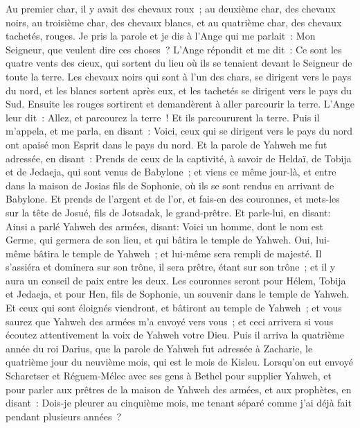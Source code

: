 \begin{multicols}{2}
Au premier char, il y avait des chevaux roux~; au deuxième char, des chevaux noirs,
au troisième char, des chevaux blancs, et au quatrième char, des chevaux tachetés, rouges.
Je pris la parole et je dis à l'Ange qui me parlait~: Mon Seigneur, que veulent dire ces choses~?
L'Ange répondit et me dit~: Ce sont les quatre vents des cieux, qui sortent du lieu où ils se tenaient devant le Seigneur de toute la terre.
Les chevaux noirs qui sont à l'un des chars, se dirigent vers le pays du nord, et les blancs sortent après eux, et les tachetés se dirigent vers le pays du Sud.
Ensuite les rouges sortirent et demandèrent à aller parcourir la terre. L'Ange leur dit~: Allez, et parcourez la terre~! Et ils parcoururent la terre.
Puis il m'appela, et me parla, en disant~: Voici, ceux qui se dirigent vers le pays du nord ont apaisé mon Esprit dans le pays du nord.
Et la parole de Yahweh me fut adressée, en disant~:
Prends de ceux de la captivité, à savoir de Heldaï, de Tobija et de Jedaeja, qui sont venus de Babylone~; et viens ce même jour-là, et entre dans la maison de Josias fils de Sophonie, où ils se sont rendus en arrivant de Babylone.
Et prends de l'argent et de l'or, et fais-en des couronnes, et mets-les sur la tête de Josué, fils de Jotsadak, le grand-prêtre.
Et parle-lui, en disant: Ainsi a parlé Yahweh des armées, disant: Voici un homme, dont le nom est Germe, qui germera de son lieu, et qui bâtira le temple de Yahweh.
Oui, lui-même bâtira le temple de Yahweh~; et lui-même sera rempli de majesté. Il s'assiéra et dominera sur son trône, il sera prêtre, étant sur son trône~; et il y aura un conseil de paix entre les deux.
Les couronnes seront pour Hélem, Tobija et Jedaeja, et pour Hen, fils de Sophonie, un souvenir dans le temple de Yahweh.
 Et ceux qui sont éloignés viendront, et bâtiront au temple de Yahweh~; et vous saurez que Yahweh des armées m'a envoyé vers vous~; et ceci arrivera si vous écoutez attentivement la voix de Yahweh votre Dieu.
\VerseOne{}Puis il arriva la quatrième année du roi Darius, que la parole de Yahweh fut adressée à Zacharie, le quatrième jour du neuvième mois, qui est le mois de Kisleu.
Lorsqu'on eut envoyé Scharetser et Réguem-Mélec avec ses gens à Bethel pour supplier Yahweh,
et pour parler aux prêtres de la maison de Yahweh des armées, et aux prophètes, en disant~: Dois-je pleurer au cinquième mois, me tenant séparé comme j'ai déjà fait pendant plusieurs années~?

\end{multicols}
